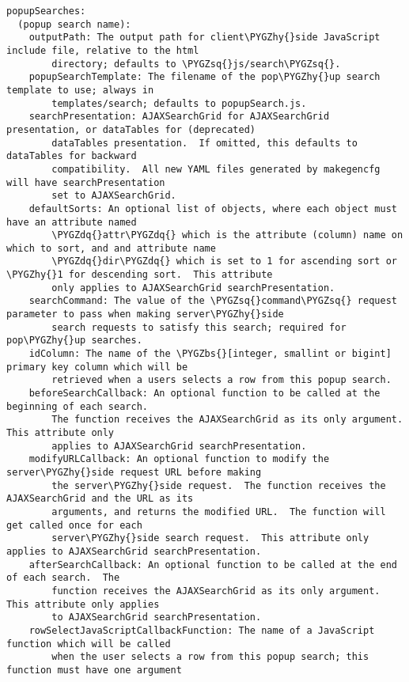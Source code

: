 \documentclass[letterpaper,10pt,english]{sphinxmanual}
\def\PYGZbs{\char`\\}
\def\PYGZhy{\char`\-}
\def\PYGZsq{\char`\'}
\def\PYGZdq{\char`\"}
\renewcommand\PYGZsq{\textquotesingle}
\begin{document}
\begin{Verbatim}[commandchars=\\\{\}]
popupSearches:
  (popup search name):
    outputPath: The output path for client\PYGZhy{}side JavaScript include file, relative to the html
        directory; defaults to \PYGZsq{}js/search\PYGZsq{}.
    popupSearchTemplate: The filename of the pop\PYGZhy{}up search template to use; always in
        templates/search; defaults to popupSearch.js.
    searchPresentation: AJAXSearchGrid for AJAXSearchGrid presentation, or dataTables for (deprecated)
        dataTables presentation.  If omitted, this defaults to dataTables for backward
        compatibility.  All new YAML files generated by makegencfg will have searchPresentation
        set to AJAXSearchGrid.
    defaultSorts: An optional list of objects, where each object must have an attribute named
        \PYGZdq{}attr\PYGZdq{} which is the attribute (column) name on which to sort, and and attribute name
        \PYGZdq{}dir\PYGZdq{} which is set to 1 for ascending sort or \PYGZhy{}1 for descending sort.  This attribute
        only applies to AJAXSearchGrid searchPresentation.
    searchCommand: The value of the \PYGZsq{}command\PYGZsq{} request parameter to pass when making server\PYGZhy{}side
        search requests to satisfy this search; required for pop\PYGZhy{}up searches.
    idColumn: The name of the \PYGZbs{}[integer, smallint or bigint] primary key column which will be
        retrieved when a users selects a row from this popup search.
    beforeSearchCallback: An optional function to be called at the beginning of each search.
        The function receives the AJAXSearchGrid as its only argument.  This attribute only
        applies to AJAXSearchGrid searchPresentation.
    modifyURLCallback: An optional function to modify the server\PYGZhy{}side request URL before making
        the server\PYGZhy{}side request.  The function receives the AJAXSearchGrid and the URL as its
        arguments, and returns the modified URL.  The function will get called once for each
        server\PYGZhy{}side search request.  This attribute only applies to AJAXSearchGrid searchPresentation.
    afterSearchCallback: An optional function to be called at the end of each search.  The
        function receives the AJAXSearchGrid as its only argument.  This attribute only applies
        to AJAXSearchGrid searchPresentation.
    rowSelectJavaScriptCallbackFunction: The name of a JavaScript function which will be called
        when the user selects a row from this popup search; this function must have one argument

\end{Verbatim}
\end{document}

